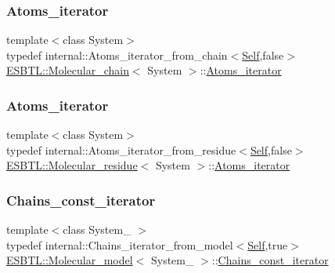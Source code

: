 \mbox{\label{group__grp__iters_gab2ee52ce4f9b656648669214cc44a4ea}} 
\subsubsection{\texorpdfstring{Atoms\+\_\+iterator}{Atoms\_iterator}\hspace{0.1cm}{\footnotesize\ttfamily [3/4]}}
{\footnotesize\ttfamily template$<$class System$>$ \\
typedef internal\+::\+Atoms\+\_\+iterator\+\_\+from\+\_\+chain$<$\hyperlink{classESBTL_1_1Molecular__chain}{Self},false$>$ \hyperlink{classESBTL_1_1Molecular__chain}{E\+S\+B\+T\+L\+::\+Molecular\+\_\+chain}$<$ System $>$\+::\hyperlink{group__grp__iters_gab2ee52ce4f9b656648669214cc44a4ea}{Atoms\+\_\+iterator}}

\mbox{\label{group__grp__iters_ga4f220ea2d647f555b579a7ab2831baa7}} 
\subsubsection{\texorpdfstring{Atoms\+\_\+iterator}{Atoms\_iterator}\hspace{0.1cm}{\footnotesize\ttfamily [4/4]}}
{\footnotesize\ttfamily template$<$class System$>$ \\
typedef internal\+::\+Atoms\+\_\+iterator\+\_\+from\+\_\+residue$<$\hyperlink{classESBTL_1_1Molecular__residue}{Self},false$>$ \hyperlink{classESBTL_1_1Molecular__residue}{E\+S\+B\+T\+L\+::\+Molecular\+\_\+residue}$<$ System $>$\+::\hyperlink{group__grp__iters_ga4f220ea2d647f555b579a7ab2831baa7}{Atoms\+\_\+iterator}}

\mbox{\label{group__grp__iters_ga32c6b305275f21f3b184688be9d38ffd}} 
\subsubsection{\texorpdfstring{Chains\+\_\+const\+\_\+iterator}{Chains\_const\_iterator}}
{\footnotesize\ttfamily template$<$class System\+\_\+ $>$ \\
typedef internal\+::\+Chains\+\_\+iterator\+\_\+from\+\_\+model$<$\hyperlink{classESBTL_1_1Molecular__model}{Self},true$>$ \hyperlink{classESBTL_1_1Molecular__model}{E\+S\+B\+T\+L\+::\+Molecular\+\_\+model}$<$ System\+\_\+ $>$\+::\hyperlink{group__grp__iters_ga32c6b305275f21f3b184688be9d38ffd}{Chains\+\_\+const\+\_\+iterator}}

